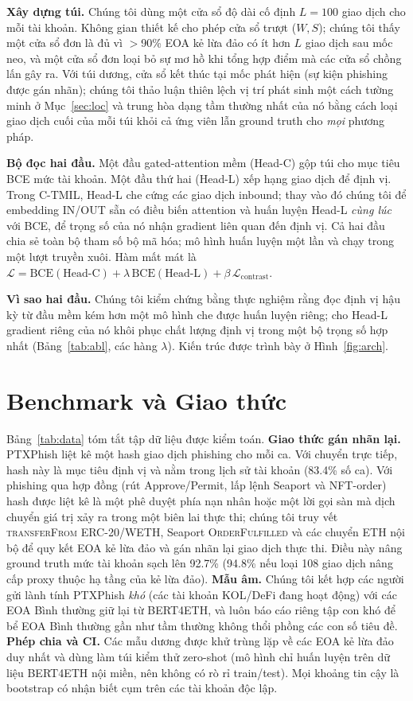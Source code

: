 \documentclass[conference]{IEEEtran}
\begin{document}
\noindent\textbf{Xây dựng túi.} Chúng tôi dùng một cửa sổ độ dài cố định
$L{=}100$ giao dịch cho mỗi tài khoản. Không gian thiết kế cho phép cửa sổ trượt
($W,S$); chúng tôi thấy một cửa sổ đơn là đủ vì $>$90\% EOA kẻ lừa đảo có ít hơn
$L$ giao dịch sau mốc neo, và một cửa sổ đơn loại bỏ sự mơ hồ khi tổng hợp điểm mà
các cửa sổ chồng lấn gây ra. Với túi dương, cửa sổ kết thúc tại mốc phát hiện (sự
kiện phishing được gán nhãn); chúng tôi thảo luận thiên lệch vị trí phát sinh một
cách tường minh ở Mục~\ref{sec:loc} và trung hòa dạng tầm thường nhất của nó bằng
cách loại giao dịch cuối của mỗi túi khỏi cả ứng viên lẫn ground truth cho
\emph{mọi} phương pháp.

\noindent\textbf{Bộ đọc hai đầu.} Một đầu gated-attention mềm (Head-C) gộp túi cho
mục tiêu BCE mức tài khoản. Một đầu thứ hai (Head-L) xếp hạng giao dịch để định vị.
Trong C-TMIL, Head-L che cứng các giao dịch inbound; thay vào đó chúng tôi để
embedding IN/OUT sẵn có điều biến attention và huấn luyện Head-L \emph{cùng lúc} với
BCE, để trọng số của nó nhận gradient liên quan đến định vị. Cả hai đầu chia sẻ toàn
bộ tham số bộ mã hóa; mô hình huấn luyện một lần và chạy trong một lượt truyền xuôi.
Hàm mất mát là $\mathcal{L}=\mathrm{BCE}(\text{Head-C})+\lambda\,
\mathrm{BCE}(\text{Head-L})+\beta\,\mathcal{L}_{\text{contrast}}$.

\noindent\textbf{Vì sao hai đầu.} Chúng tôi kiểm chứng bằng thực nghiệm rằng đọc
định vị hậu kỳ từ đầu mềm kém hơn một mô hình che được huấn luyện riêng; cho Head-L
gradient riêng của nó khôi phục chất lượng định vị trong một bộ trọng số hợp nhất
(Bảng~\ref{tab:abl}, các hàng $\lambda$). Kiến trúc được trình bày ở
Hình~\ref{fig:arch}.

\section{Benchmark và Giao thức}\label{sec:bench}
Bảng~\ref{tab:data} tóm tắt tập dữ liệu được kiểm toán.
\textbf{Giao thức gán nhãn lại.} PTXPhish liệt kê một hash giao dịch phishing cho
mỗi ca. Với chuyển trực tiếp, hash này là mục tiêu định vị và nằm trong lịch sử tài
khoản (83.4\% số ca). Với phishing qua hợp đồng (rút Approve/Permit, lấp lệnh
Seaport và NFT-order) hash được liệt kê là một phê duyệt phía nạn nhân hoặc một lời
gọi sàn mà dịch chuyển giá trị xảy ra trong một biên lai thực thi; chúng tôi truy
vết \textsc{transferFrom} ERC-20/WETH, Seaport \textsc{OrderFulfilled} và các chuyển
ETH nội bộ để quy kết EOA kẻ lừa đảo và gán nhãn lại giao dịch thực thi. Điều này
nâng ground truth mức tài khoản sạch lên 92.7\% (94.8\% nếu loại 108 giao dịch
nâng cấp proxy thuộc hạ tầng của kẻ lừa đảo).
\textbf{Mẫu âm.} Chúng tôi kết hợp các người gửi lành tính PTXPhish \emph{khó} (các
tài khoản KOL/DeFi đang hoạt động) với các EOA Bình thường giữ lại từ BERT4ETH, và
luôn báo cáo riêng tập con khó để bể EOA Bình thường gần như tầm thường không thổi
phồng các con số tiêu đề.
\textbf{Phép chia và CI.} Các mẫu dương được khử trùng lặp về các EOA kẻ lừa đảo duy
nhất và dùng làm túi kiểm thử zero-shot (mô hình chỉ huấn luyện trên dữ liệu
BERT4ETH nội miền, nên không có rò rỉ train/test). Mọi khoảng tin cậy là bootstrap
có nhận biết cụm trên các tài khoản độc lập.
\end{document}
